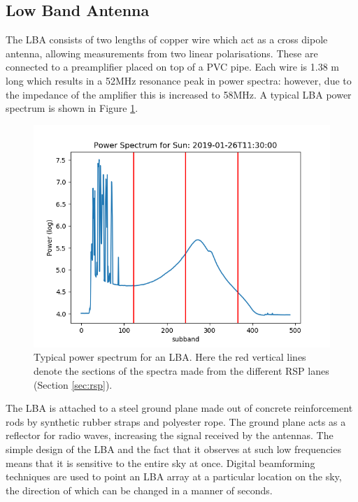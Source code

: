 \subsection{Low Band Antenna}
The LBA consists of two lengths of copper wire which act as a cross dipole antenna, allowing measurements from two linear polarisations. These are connected to a preamplifier placed on top of a PVC pipe. 
Each wire is 1.38 m long which results in a 52MHz resonance peak in power spectra: however, due to the impedance of the amplifier this is increased to 58MHz. A typical LBA power spectrum is shown in Figure \ref{fig:mode3_spec}.
\begin{figure}[t]
    \centering
    \includegraphics[width=0.75\columnwidth]{Images/Sun_pspec.png}
    \caption[Typical power spectrum for an LBA.]{Typical power spectrum for an LBA. Here the red vertical lines denote the sections of the spectra made from the different RSP lanes (Section \ref{sec:rsp}).}
    \label{fig:mode3_spec}
\end{figure}
The LBA is attached to a steel ground plane made out of concrete reinforcement rods by synthetic rubber straps and polyester rope. The ground plane acts as a reflector for radio waves, increasing the signal received by the antennas.
The simple design of the LBA and the fact that it observes at such low frequencies means that it is sensitive to the entire sky at once. Digital beamforming techniques are used to point an LBA array at a particular location on the sky, the direction of which can be changed in a manner of seconds.
